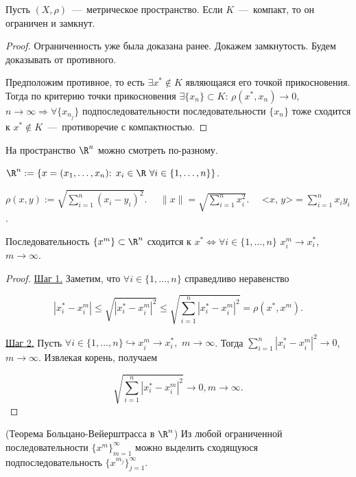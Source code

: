 \begin{theorem}
    Пусть $(X, \rho)$~---~метрическое пространство. Если $K$~---~компакт, то он ограничен и замкнут.
\end{theorem}
\begin{proof}
    Ограниченность уже была доказана ранее. Докажем замкнутость. Будем доказывать от противного.

    Предположим противное, то есть $\exists x^{*} \not\in K$ являющаяся его точкой прикосновения. Тогда по критерию точки прикосновения $\exists \{ x_{n} \} \subset K$: $\rho(x^{*}, x_n)\to 0$, $n\to \infty \Rightarrow \forall \{ x_{n_{j}}\}$ подпоследовательности последовательности $\{ x_{n}\}$ тоже сходится к $x^{*} \not\in K$~---~противоречие с компактностью.
\end{proof}
\begin{reminder} На пространство $\R^{n}$ можно смотреть по-разному.

    $\R^{n} := \left\{ x = (x_{1}, \ldots, x_{n})\text{: }x_{i} \in \R \ \forall i \in \{ 1, \ldots, n\}\right\}$.
    
    $\displaystyle \rho(x, y) := \sqrt{\sum_{i = 1}^{n} (x_{i} - y_{i})^{2}}$. $\quad \displaystyle \| x \| = \sqrt{\sum_{i = 1}^{n} x_{i}^{2}}$.$\quad$ <$x$, $y$>$\displaystyle = \sum_{i = 1}^{n} x_{i} y_{i}$.
\end{reminder}
\begin{lemma}
    Последовательность $\{ x^m \} \subset \R^n$ сходится к $x^{*} \Leftrightarrow \forall i \in \{ 1, \ldots, n\}$ $x_{i}^{m}\to x^{*}_{i}$, $m\to \infty$.
\end{lemma}
\begin{proof}
    \underline{Шаг 1.} Заметим, что $\forall i \in \{ 1, \ldots, n\}$ справедливо неравенство

    $$\displaystyle |x_{i}^{*} - x_{i}^{m}| \leq \sqrt{|x_{i}^{*} - x_{i}^{m}|^{2}} \leq \sqrt{\sum_{i = 1}^{n}|x_{i}^{*} - x_{i}^{m}|^{2}} = \rho(x^{*}, x^{m}).$$

    \underline{Шаг 2.} Пусть $\forall i \in \{1, \ldots, n\} \hookrightarrow x^{m}_{i}\to x^{*}_{i},$ $m\to \infty$. Тогда $\displaystyle \sum_{i = 1}^{n} |x^{*}_{i} - x^{m}_{i}|^{2}\to 0$, $m\to \infty$. Извлекая корень, получаем

    $$\displaystyle \sqrt{\sum_{i = 1}^{n}|x_{i}^{*} - x_{i}^{m}|^{2}} \to 0, m\to \infty.$$
\end{proof}
\begin{theorem}
    \hypertarget{thm7.10}{(Теорема Больцано-Вейерштрасса в $\R^{n}$) Из любой ограниченной последовательности $\{ x^m \}_{m = 1}^{\infty}$ можно выделить сходящуюся подпоследовательность $\{ x^{m_{j}} \}_{j = 1}^{\infty}$.}
\end{theorem}
